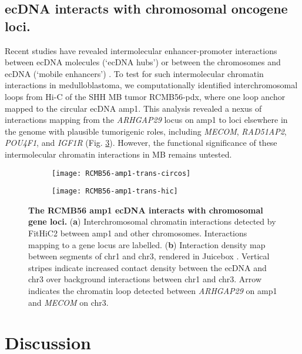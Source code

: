 \subsection{ecDNA interacts with chromosomal oncogene loci.}
Recent studies have revealed intermolecular enhancer-promoter interactions between ecDNA molecules (`ecDNA hubs') \cite{hung_2021} or between the chromosomes and ecDNA (`mobile enhancers') \cite{Zhu_2021}. To test for such intermolecular chromatin interactions in medulloblastoma, we computationally identified interchromosomal loops from Hi-C of the SHH MB tumor RCMB56-pdx, where one loop anchor mapped to the circular ecDNA amp1. This analysis revealed a nexus of interactions mapping from the \textit{ARHGAP29} locus on amp1 to loci elsewhere in the genome with plausible tumorigenic roles, including \textit{MECOM}, \textit{RAD51AP2}, \textit{POU4F1}, and \textit{IGF1R} (Fig. \ref{fig:mobile-enhancers}). However, the functional significance of these intermolecular chromatin interactions in MB remains untested.

\begin{figure}[!h]
    \begin{subfigure}{.49\textwidth}
        \centering
        \texttt{[image: RCMB56-amp1-trans-circos]}
        \caption{}
        \label{subfig:RCMB56-amp1-trans}
    \end{subfigure}
    \begin{subfigure}{.49\textwidth}
        \centering
        \texttt{[image: RCMB56-amp1-trans-hic]}
        \caption{}
        \label{subfig:rcmb56-mecom}
    \end{subfigure}
    \caption[The RCMB56 amp1 ecDNA interacts with chromosomal gene loci.]{\textbf{The RCMB56 amp1 ecDNA interacts with chromosomal gene loci.} (\textbf{a}) Interchromosomal chromatin interactions detected by FitHiC2 \cite{fithic2} between amp1 and other chromosomes. Interactions mapping to a gene locus are labelled. (\textbf{b})  Interaction density map between segments of chr1 and chr3, rendered in Juicebox \cite{juicebox}. Vertical stripes indicate increased contact density between the ecDNA and chr3 over background interactions between chr1 and chr3. Arrow indicates the chromatin loop detected between \textit{ARHGAP29} on amp1 and \textit{MECOM} on chr3. 
    }
    \label{fig:mobile-enhancers}
\end{figure}

\section{Discussion}
    
